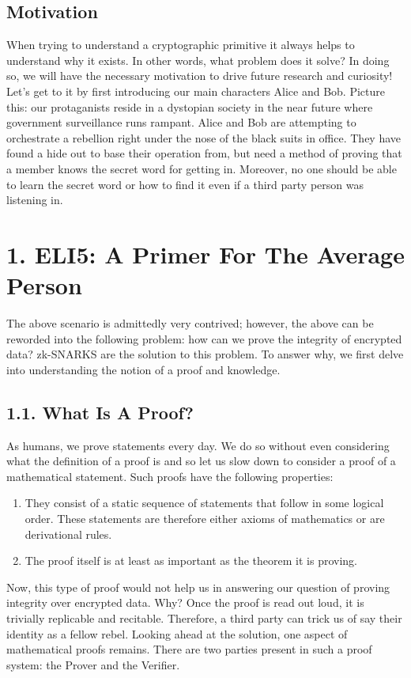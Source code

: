 \documentclass{article}
\begin{document}
\subsection*{Motivation}
When trying to understand a cryptographic primitive it always helps to understand why it exists. In other words, what problem does it solve? In doing so, we will have the necessary motivation to drive future research and curiosity! Let's get to it by first introducing our main characters Alice and Bob. Picture this: our protaganists reside in a dystopian society in the near future where government surveillance runs rampant. Alice and Bob are attempting to orchestrate a rebellion right under the nose of the black suits in office. They have found a hide out to base their operation from, but need a method of proving that a member knows the secret word for getting in. Moreover, no one should be able to learn the secret word or how to find it even if a third party person was listening in.


\section*{1. ELI5: A Primer For The Average Person}
The above scenario is admittedly very contrived; however, the above can be reworded into the following problem: how can we prove the integrity of encrypted data? zk-SNARKS are the solution to this problem. To answer why, we first delve into understanding the notion of a proof and knowledge.
\subsection*{1.1. What Is A Proof?}
As humans, we prove statements every day. We do so without even considering what the definition of a proof is and so let us slow down to consider a proof of a mathematical statement. Such proofs have the following properties:
\begin{enumerate}
    \item They consist of a static sequence of statements that follow in some logical order. These statements are therefore either axioms of mathematics or are derivational rules.
    \item The proof itself is at least as important as the theorem it is proving.
\end{enumerate}
Now, this type of proof would not help us in answering our question of proving integrity over encrypted data. Why? Once the proof is read out loud, it is trivially replicable and recitable. Therefore, a third party can trick us of say their identity as a fellow rebel. Looking ahead at the solution, one aspect of mathematical proofs remains. There are two parties present in such a proof system: the Prover and the Verifier.
\end{document}
